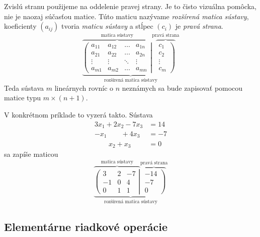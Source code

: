 Zvislú stranu použijeme na oddelenie pravej strany. Je to čisto vizuálna pomôcka, nie
je naozaj súčasťou matice. Túto maticu nazývame \emph{rozšírená matica sústavy},
koeficienty $(a_{ij})$ tvoria \emph{maticu sústavy} a stĺpec $(c_i)$ je \emph{pravá
strana}.
$$
\underbrace{
    \overbrace{
        \left(
        \begin{array}{cccc}
            a_{11} & a_{12} & \dots & a_{1n} \\
            a_{21} & a_{22} & \dots & a_{2n} \\
            \vdots & \vdots & \ddots & \vdots \\
            a_{m1} & a_{m2} & \dots & a_{mn}
        \end{array}
        \right|
    }^{\text{matica sústavy}}
    \overbrace{
        \left.
        \begin{array}{c}
            c_{1} \\
            c_{2} \\
            \vdots \\
            c_{m}
        \end{array}
        \right)
    }^{\text{pravá strana}}
}_{\text{rozšírená matica sústavy}}
$$
Teda sústava $m$ lineárnych rovníc o $n$ neznámych sa bude zapisovať
pomocou matice typu $m\times(n+1)$.

V konkrétnom príklade to vyzerá takto.
Sústava
\begin{align*}
    3x_{1} + 2x_{2} - 7x_{3} &= 14 \\
    -x_{1} \qquad + 4x_{3} &= -7 \\
    \qquad x_{2} + x_{3} &= 0
\end{align*}
sa zapíše maticou
$$ \underbrace{
\overbrace{
\left(
\begin{array}{ccc}
3 & 2 & -7 \\
-1 & 0 & 4 \\
0 & 1 & 1 
\end{array}
\right|
}^{\text{matica sústavy}}
\overbrace{
\left.
\begin{array}{c}
-14 \\
-7 \\
0
\end{array}
\right)
}^{\text{pravá strana}}
}_{\text{rozšírená matica sústavy}}
$$
\subsection{Elementárne riadkové operácie}

